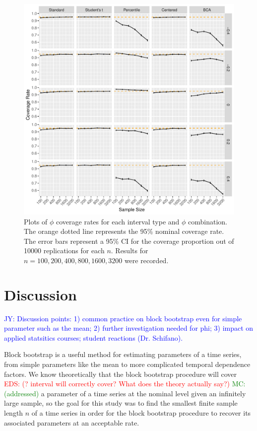 \documentclass[12pt, letterpaper, titlepage]{article}
\newcommand{\jy}[1]{\textcolor{blue}{JY: #1}}
\newcommand{\eds}[1]{\textcolor{red}{EDS: (#1)}}
\newcommand{\mc}[1]{\textcolor{green}{MC: (#1)}}
\begin{document}
\begin{figure}[tbp]
  \centering
  \includegraphics[width=\textwidth]{figures/plot_phi}
  \caption{Plots of $\phi$ coverage rates for each interval type and $\phi$
    combination. The orange dotted line represents the 95\% nominal coverage
    rate. The error bars represent a 95\% CI for the coverage
    proportion out of 10000 replications for each $n$. Results for 
    $n = 100, 200, 400, 800, 1600, 3200$ were recorded.}
  \label{fig:phi}
\end{figure}




\section{Discussion}
\label{sec:disc}

\jy{Discussion points:
  1) common practice on block bootstrap even for simple parameter such as the
  mean;
  2) further investigation needed for phi;
  3) impact on applied statsitics courses; student reactions (Dr. Schifano).
}


Block bootstrap is a useful method for estimating parameters of a time
series, from simple parameters like the mean to more complicated temporal
 dependence factors.
 We know theoretically that the block bootstrap procedure will cover
 \eds{? interval will correctly cover?  What does the theory  actually say?}
 \mc{addressed} a
 parameter of a time series at the nominal level given an
 infinitely large
sample, so the goal for this study was to find the smallest finite
sample length $n$ of a time series in order for the block bootstrap procedure
to 
recover its associated parameters at an acceptable rate.
\end{document}
